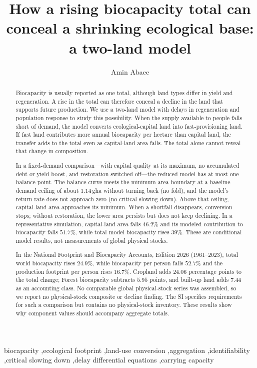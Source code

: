 \documentclass[preprint,12pt,authoryear]{elsarticle}
\begin{document}
\begin{frontmatter}

\title{How a rising biocapacity total can conceal a shrinking ecological base: a two-land model}

\author[1]{Amin Abaee}

\begin{abstract}
\footnotesize
Biocapacity is usually reported as one total, although land types differ in yield and regeneration. A rise in the total can therefore conceal a decline in the land that supports future production. We use a two-land model with delays in regeneration and population response to study this possibility. When the supply available to people falls short of demand, the model converts ecological-capital land into fast-provisioning land. If fast land contributes more annual biocapacity per hectare than capital land, the transfer adds to the total even as capital-land area falls. The total alone cannot reveal that change in composition.

In a fixed-demand comparison—with capital quality at its maximum, no accumulated debt or yield boost, and restoration switched off—the reduced model has at most one balance point. The balance curve meets the minimum-area boundary at a baseline demand ceiling of about $1.14$\,gha without turning back (no fold), and the model's return rate does not approach zero (no critical slowing down). Above that ceiling, capital-land area approaches its minimum. When a shortfall disappears, conversion stops; without restoration, the lower area persists but does not keep declining. In a representative simulation, capital-land area falls $46.2\%$ and its modeled contribution to biocapacity falls $51.7\%$, while total model biocapacity rises $39\%$. These are conditional model results, not measurements of global physical stocks.

In the National Footprint and Biocapacity Accounts, Edition 2026 (1961--2023), total world biocapacity rises $24.9\%$, while biocapacity per person falls $52.7\%$ and the production footprint per person rises $16.7\%$. Cropland adds $24.06$ percentage points to the total change; Forest biocapacity subtracts $5.95$ points, and built-up land adds $7.44$ as an accounting class. No comparable global physical-stock series was assembled, so we report no physical-stock composite or decline finding. The SI specifies requirements for such a comparison but contains no physical-stock inventory. These results show why component values should accompany aggregate totals.
\end{abstract}

\begin{keyword}
\footnotesize
biocapacity \sep ecological footprint \sep land-use conversion \sep aggregation \sep identifiability \sep critical slowing down \sep delay differential equations \sep carrying capacity
\end{keyword}

\end{frontmatter}
\end{document}
